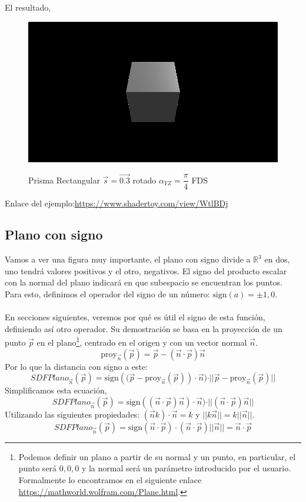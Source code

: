 El resultado,
\begin{figure}[H]
  \centering
  \captionsetup{justification=centering}%
  \includegraphics[width=1.0\textwidth]{secciones/imagenes/sdf/3d/sdf_prisma_rect.png}\label{fig:prisma}
  \caption{Prisma Rectangular \(\Vec{s}=\Vec{0.3}\) rotado \(\alpha_{YZ}=\dfrac{\pi}{4}\) FDS}
\end{figure}

Enlace del ejemplo:\url{https://www.shadertoy.com/view/WtlBDj}

\subsection{Plano con signo}
Vamos a ver una figura muy importante, el plano con signo divide a \(\mathbb{R}^3\) en dos, uno tendrá valores positivos y el otro, negativos. El signo del producto escalar con la normal del plano indicará en que subespacio se encuentran los puntos. Para esto, definimos el operador del signo de un número:  \(\text{sign}(a)=\pm 1, 0\).\\\\
En secciones siguientes, veremos por qué es útil el signo de esta función, definiendo así otro operador. Su demostración se basa en la proyección de un punto \(\Vec{p}\) en el plano\footnote{Podemos definir un plano a partir de su normal y un punto, en particular, el punto será \(0,0,0\) y la normal será un parámetro introducido por el usuario. Formalmente lo encontramos en el siguiente enlace \url{https://mathworld.wolfram.com/Plane.html}.}, centrado en el origen y con un vector normal \(\Vec{n}\).
\[\text{proy}_{\Vec{n}}(\Vec{p}) = \Vec{p} - (\Vec{n}\cdot\Vec{p})\Vec{n} \]
Por lo que la distancia con signo a este:
\[ SDFPlano_{\Vec{n}}(\Vec{p})=\text{sign}\left((\Vec{p}-\text{proy}_{\Vec{n}}(\Vec{p})\right) \cdot \Vec{n})\cdot \vert \vert \Vec{p} - \text{proy}_{\Vec{n}}(\Vec{p}) \vert\vert \]
Simplificamos esta ecuación,
\[ SDFPlano_{\Vec{n}}(\Vec{p}) = \text{sign}\left((\Vec{n}\cdot\Vec{p})\Vec{n}\right) \cdot \Vec{n})\cdot \vert \vert (\Vec{n}\cdot\Vec{p})\Vec{n}  \vert\vert \]
Utilizando las siguientes propiedades: \((\Vec{n}k)\cdot\Vec{n}=k\) y \(\vert\vert k\Vec{n}\vert\vert=k\vert\vert\Vec{n}\vert\vert\).
\[ SDFPlano_{\Vec{n}}(\Vec{p})=\text{sign}\left(\Vec{n}\cdot\Vec{p}\right)\cdot (\Vec{n}\cdot\Vec{p}) \vert \vert\Vec{n}\vert\vert=\Vec{n}\cdot\Vec{p}\]

